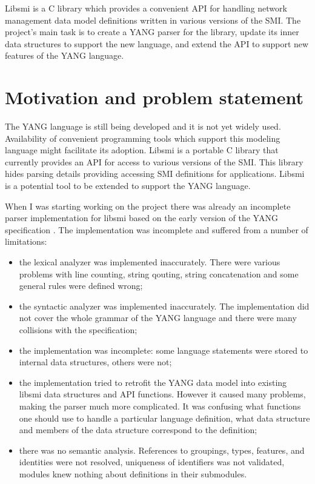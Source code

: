 \documentclass[conference]{IEEEtran}
\begin{document}
Libsmi is a C library which provides a convenient API for handling network management data model definitions written in various versions of the SMI.
The project's main task is to create a YANG parser for the library, update its inner data structures to support the new language, 
and extend the API to support new features of the YANG language.

\section{Motivation and problem statement}
The YANG language is still being developed and it is not yet widely used. Availability of convenient programming tools which support this modeling language might facilitate its adoption. Libsmi is  a portable C library that currently provides an API for access to various versions of the SMI. This library hides parsing details providing accessing SMI definitions for applications. Libsmi is a potential tool to be extended to support the YANG language. 

When I was starting working on the project there was already an incomplete parser implementation for libsmi based 
on the early version of the YANG specification  \cite{bib2}. 
The implementation was incomplete and suffered from a number of limitations: 
\begin{itemize}
	\item the lexical analyzer was implemented inaccurately. 
	There were various problems with line counting, string qouting, string concatenation and some general rules were defined wrong;
	\item the syntactic analyzer was implemented inaccurately. The implementation did not cover the whole grammar of the YANG language 
	and there were many collisions with the specification;
	\item the implementation was incomplete: some language statements were stored to internal data structures, others were not;
	\item the implementation tried to retrofit the YANG data model into existing libsmi data structures and API functions. 
	However it caused many problems, making the parser much more complicated.
	It was confusing what functions one should use to handle a particular language definition, what data structure and members of the data structure correspond to the definition;
	\item there was no semantic analysis. References to groupings, types, features, and identities were not resolved, uniqueness of identifiers was not validated, modules knew nothing about definitions in their submodules.
\end{itemize}
\end{document}
